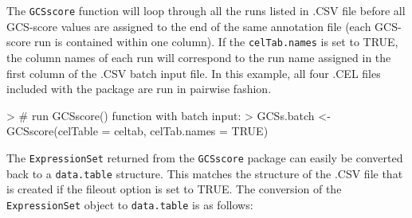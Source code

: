 \documentclass[12pt]{article}
\newcommand{\Rfunction}[1]{{\texttt{#1}}}
\newcommand{\Robject}[1]{{\texttt{#1}}}
\begin{document}
The \Rfunction{GCSscore} function will loop through all the runs listed in .CSV file before all GCS-score values are assigned to the end of the same annotation file (each GCS-score run is contained within one column). If the \Robject{celTab.names} is set to TRUE, the column names of each run will correspond to the run name assigned in the first column of the .CSV batch input file.  In this example, all four .CEL files included with the package are run in pairwise fashion.

\begin{Schunk}
\begin{Sinput}
> # run GCSscore() function with batch input:
> GCSs.batch <- GCSscore(celTable = celtab, celTab.names = TRUE)
\end{Sinput}
\end{Schunk}

The \Robject{ExpressionSet} returned from the \Rfunction{GCSscore} package can easily be converted back to a \Robject{data.table} structure.  This matches the structure of the .CSV file that is created if the fileout option is set to TRUE.  The conversion of the \Robject{ExpressionSet} object to \Robject{data.table} is as follows:
\end{document}
